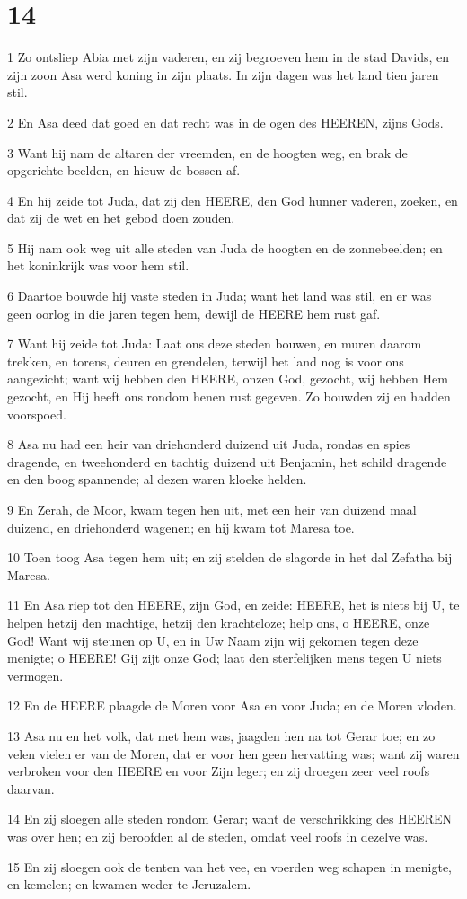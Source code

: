 \chapter{14}

\par 1 Zo ontsliep Abia met zijn vaderen, en zij begroeven hem in de stad Davids, en zijn zoon Asa werd koning in zijn plaats. In zijn dagen was het land tien jaren stil.
\par 2 En Asa deed dat goed en dat recht was in de ogen des HEEREN, zijns Gods.
\par 3 Want hij nam de altaren der vreemden, en de hoogten weg, en brak de opgerichte beelden, en hieuw de bossen af.
\par 4 En hij zeide tot Juda, dat zij den HEERE, den God hunner vaderen, zoeken, en dat zij de wet en het gebod doen zouden.
\par 5 Hij nam ook weg uit alle steden van Juda de hoogten en de zonnebeelden; en het koninkrijk was voor hem stil.
\par 6 Daartoe bouwde hij vaste steden in Juda; want het land was stil, en er was geen oorlog in die jaren tegen hem, dewijl de HEERE hem rust gaf.
\par 7 Want hij zeide tot Juda: Laat ons deze steden bouwen, en muren daarom trekken, en torens, deuren en grendelen, terwijl het land nog is voor ons aangezicht; want wij hebben den HEERE, onzen God, gezocht, wij hebben Hem gezocht, en Hij heeft ons rondom henen rust gegeven. Zo bouwden zij en hadden voorspoed.
\par 8 Asa nu had een heir van driehonderd duizend uit Juda, rondas en spies dragende, en tweehonderd en tachtig duizend uit Benjamin, het schild dragende en den boog spannende; al dezen waren kloeke helden.
\par 9 En Zerah, de Moor, kwam tegen hen uit, met een heir van duizend maal duizend, en driehonderd wagenen; en hij kwam tot Maresa toe.
\par 10 Toen toog Asa tegen hem uit; en zij stelden de slagorde in het dal Zefatha bij Maresa.
\par 11 En Asa riep tot den HEERE, zijn God, en zeide: HEERE, het is niets bij U, te helpen hetzij den machtige, hetzij den krachteloze; help ons, o HEERE, onze God! Want wij steunen op U, en in Uw Naam zijn wij gekomen tegen deze menigte; o HEERE! Gij zijt onze God; laat den sterfelijken mens tegen U niets vermogen.
\par 12 En de HEERE plaagde de Moren voor Asa en voor Juda; en de Moren vloden.
\par 13 Asa nu en het volk, dat met hem was, jaagden hen na tot Gerar toe; en zo velen vielen er van de Moren, dat er voor hen geen hervatting was; want zij waren verbroken voor den HEERE en voor Zijn leger; en zij droegen zeer veel roofs daarvan.
\par 14 En zij sloegen alle steden rondom Gerar; want de verschrikking des HEEREN was over hen; en zij beroofden al de steden, omdat veel roofs in dezelve was.
\par 15 En zij sloegen ook de tenten van het vee, en voerden weg schapen in menigte, en kemelen; en kwamen weder te Jeruzalem.

